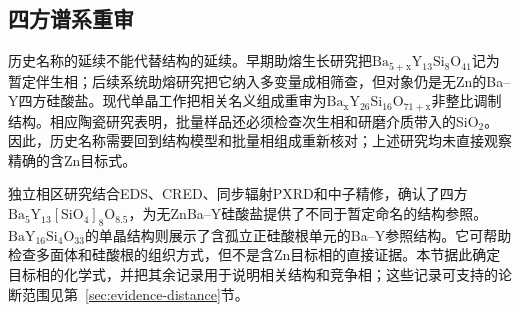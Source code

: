\subsection{四方谱系重审}

历史名称的延续不能代替结构的延续。早期助熔生长研究把$\mathrm{Ba_{5+x}Y_{13}Si_8O_{41}}$记为暂定伴生相\cite{kolitsch2009crystal}；后续系统助熔研究把它纳入多变量成相筛查，但对象仍是无Zn的Ba--Y四方硅酸盐\cite{wierzbickawieczorek2017high}。现代单晶工作把相关名义组成重审为$\mathrm{Ba_xY_{26}Si_{16}O_{71+x}}$非整比调制结构\cite{yamane2024synthesis}。相应陶瓷研究表明，批量样品还必须检查次生相和研磨介质带入的SiO$_2$\cite{yamane2024microstructure}。因此，历史名称需要回到结构模型和批量相组成重新核对；上述研究均未直接观察精确的含Zn目标式。

独立相区研究结合EDS、CRED、同步辐射PXRD和中子精修，确认了四方$\mathrm{Ba_5Y_{13}[SiO_4]_8O_{8.5}}$\cite{gulay2024navigation}\linebreak ，为无ZnBa--Y硅酸盐提供了不同于暂定命名的结构参照。$\mathrm{BaY_{16}Si_4O_{33}}$的单晶结构则展示了含孤立正硅酸根单元的Ba--Y参照结构\cite{motozawa2022bay16si4o33}。它可帮助检查多面体和硅酸根的组织方式，但不是含Zn目标相的直接证据。本节据此确定目标相的化学式，并把其余记录用于说明相关结构和竞争相；这些记录可支持的论断范围见第~\ref{sec:evidence-distance}节。
